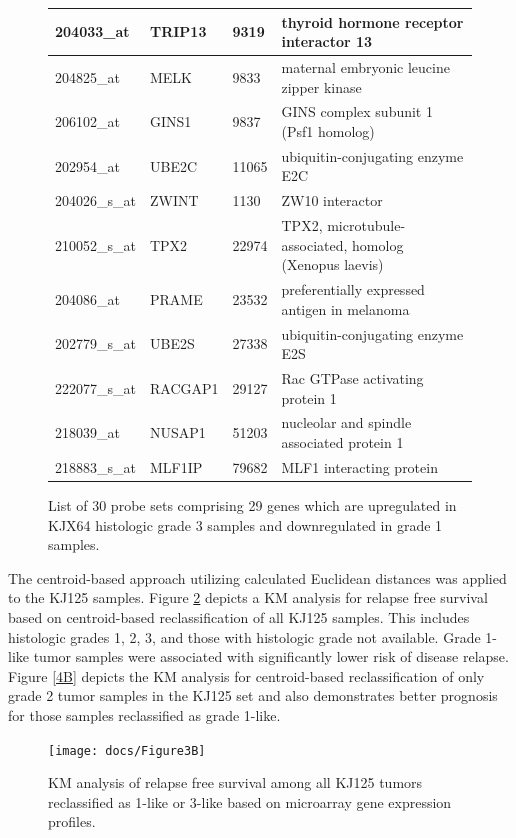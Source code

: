 \documentclass[a4paper,10pt]{article}
\begin{document}
\begin{figure}
\begin{tabular}{| l | l | l | l | }
204033\_at & TRIP13 & 9319 & thyroid hormone receptor interactor 13\\ \hline 
204825\_at & MELK & 9833 & maternal embryonic leucine zipper kinase\\ \hline 
206102\_at & GINS1 & 9837 & GINS complex subunit 1 (Psf1 homolog)\\ \hline 
202954\_at & UBE2C & 11065 & ubiquitin-conjugating enzyme E2C\\ \hline 
204026\_s\_at & ZWINT & 1130 & ZW10 interactor\\ \hline 
210052\_s\_at & TPX2 & 22974 & TPX2, microtubule-associated, homolog (Xenopus laevis)\\ \hline 
204086\_at & PRAME & 23532 & preferentially expressed antigen in melanoma\\ \hline 
202779\_s\_at & UBE2S & 27338 & ubiquitin-conjugating enzyme E2S\\ \hline 
222077\_s\_at & RACGAP1 & 29127 & Rac GTPase activating protein 1\\ \hline 
218039\_at & NUSAP1 & 51203 & nucleolar and spindle associated protein 1\\ \hline 
218883\_s\_at & MLF1IP & 79682 & MLF1 interacting protein\\ \hline
\end{tabular}
\caption{List of 30 probe sets comprising 29 genes which are upregulated in KJX64 histologic 
grade 3 samples and downregulated in grade 1 samples.}\label{T1}
\end{figure}


The centroid-based approach utilizing calculated Euclidean distances was applied to the 
KJ125 samples.   Figure \ref{3B} depicts a KM analysis for relapse free survival based on 
centroid-based reclassification of all KJ125 samples. This includes histologic grades 1, 2, 3, 
and those with histologic grade not available.  Grade 1-like tumor samples were associated 
with significantly lower risk of disease relapse.  Figure \ref{4B} depicts the KM analysis for 
centroid-based reclassification of only grade 2 tumor samples in the KJ125 set and 
also demonstrates better prognosis for those samples reclassified as grade 1-like.  

 \begin{figure}
\centering
\texttt{[image: docs/Figure3B]}
\caption{ KM analysis of relapse free survival among all 
KJ125 tumors reclassified as 1-like or 3-like based on 
microarray gene expression profiles.}\label{3B}
\end{figure}
\end{document}

